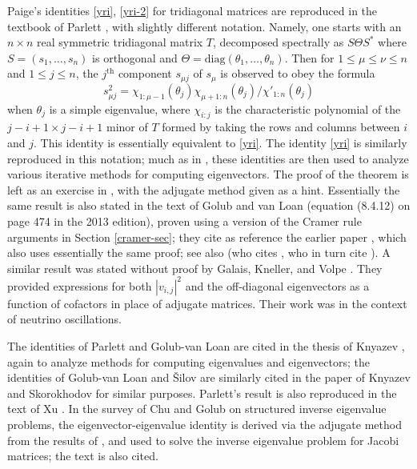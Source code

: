 \documentclass{amsart}
\begin{document}
Paige's identities \eqref{yri}, \eqref{yri-2} for tridiagonal matrices are reproduced in the textbook of Parlett \cite[Theorem 7.9.2]{Parlett}, with slightly different notation. Namely, one starts with an $n \times n$ real symmetric tridiagonal matrix $T$, decomposed spectrally as $S \Theta S^*$ where $S = (s_1,\dots,s_n)$ is orthogonal and $\Theta = \mathrm{diag}(\theta_1,\dots,\theta_n)$.  Then for $1 \leq \mu \leq \nu \leq n$ and $1 \leq j \leq n$, the $j^{\mathrm{th}}$ component $s_{\mu j}$ of $s_\mu$ is observed to obey the formula
$$ s_{\mu j}^2= \chi_{1:\mu-1}(\theta_j)  \chi_{\mu+1:n}(\theta_j) / \chi'_{1:n}(\theta_j)$$
when $\theta_j$ is a simple eigenvalue, where $\chi_{i:j}$ is the characteristic polynomial of the $j-i+1 \times j-i+1$ minor of $T$ formed by taking the rows and columns between $i$ and $j$. This identity is essentially equivalent to \eqref{yri}.  The identity \eqref{yri} is similarly reproduced in this notation; much as in \cite{paige_1971}, these identities are then used to analyze various iterative methods for computing eigenvectors.  The proof of the theorem is left as an exercise in \cite{Parlett}, with the adjugate method given as a hint.  Essentially the same result is also stated in the text of Golub and van Loan \cite[p. 432--433]{golub} (equation (8.4.12) on page 474 in the 2013 edition), proven using a version of the Cramer rule arguments in Section \ref{cramer-sec}; they cite as reference the earlier paper \cite[(3.6)]{golub1973}, which also uses essentially the same proof; see also \cite[(4.3.17)]{gladwell} (who cites \cite{BG}, who in turn cite \cite{golub1973}).
A similar result was stated without proof by Galais, Kneller, and Volpe \cite[Equations (6), (7)]{Galais:2011jh}.
They provided expressions for both $|v_{i,j}|^2$ and the off-diagonal eigenvectors as a function of cofactors in place of adjugate matrices.
Their work was in the context of neutrino oscillations.

The identities of Parlett and Golub-van Loan are cited in the thesis of Knyazev \cite[(2.2.27)]{knyazev}, again to analyze methods for computing eigenvalues and eigenvectors; the identities of Golub-van Loan and \v{S}ilov are similarly cited in the paper of Knyazev and Skorokhodov \cite{KS} for similar purposes. Parlett's result is also reproduced in the text of Xu \cite[(3.19)]{xu}.  In the survey \cite[(4.9)]{CG} of Chu and Golub on structured inverse eigenvalue problems, the eigenvector-eigenvalue identity is derived via the adjugate method from the results of \cite{Thompson:1968}, and used to solve the inverse eigenvalue problem for Jacobi matrices; the text \cite{Parlett} is also cited.
\end{document}
